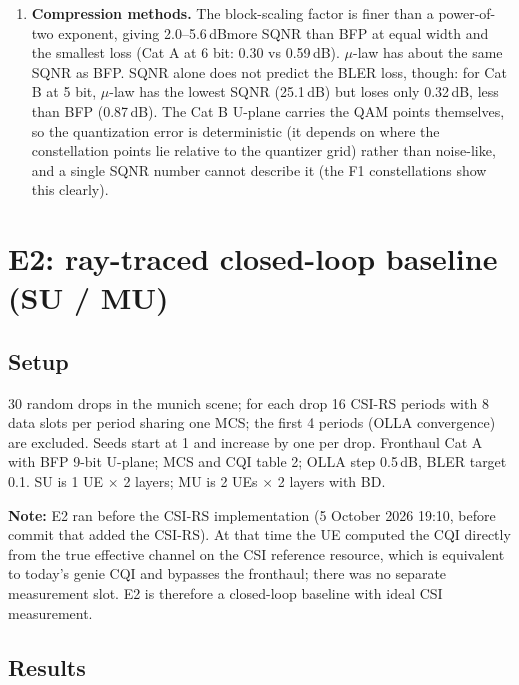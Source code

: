 \documentclass[11pt,a4paper]{article}
\DeclareRobustCommand{\code}[1]{\codeurl{#1}}  %
\newcommand{\dB}{\,dB}
\begin{document}
\begin{enumerate}
        co-scheduled UE by BD. At 5 bit and 30\dB, the RX EVM is therefore 10.9\% for Cat A and 8.0\% for Cat B. (With a single
        user the ranking reverses; see E3.)
  \item \textbf{Compression methods.} The block-scaling factor is finer than a power-of-two exponent, giving 2.0--5.6\dB more
        SQNR than BFP at equal width and the smallest loss (Cat A at 6 bit: 0.30 vs 0.59\dB). $\mu$-law has about the same SQNR as
        BFP. SQNR alone does not predict the BLER loss, though: for Cat B at 5 bit, $\mu$-law has the lowest SQNR (25.1\dB) but
        loses only 0.32\dB, less than BFP (0.87\dB). The Cat B U-plane carries the QAM points themselves, so the quantization
        error is deterministic (it depends on where the constellation points lie relative to the quantizer grid) rather than
        noise-like, and a single SQNR number cannot describe it (the F1 constellations show this clearly).
\end{enumerate}

\section{E2: ray-traced closed-loop baseline (SU / MU)}

\subsection{Setup}

30 random drops in the munich scene; for each drop 16 CSI-RS periods with 8 data slots per period sharing one MCS; the first
4 periods (OLLA convergence) are excluded. Seeds start at 1 and increase by one per drop. Fronthaul Cat A with BFP 9-bit
U-plane; MCS and CQI table 2; OLLA step 0.5\dB, BLER target 0.1. SU is 1 UE $\times$ 2 layers; MU is 2 UEs $\times$ 2 layers
with BD.

\textbf{Note:} E2 ran before the CSI-RS implementation (5 October 2026 19:10, before commit \code{e4fedff} that added the
CSI-RS). At that time the UE computed the CQI directly from the true effective channel on the CSI reference resource, which is
equivalent to today's genie CQI and bypasses the fronthaul; there was no separate measurement slot. E2 is therefore a closed-loop
baseline with ideal CSI measurement.

\subsection{Results}
\end{document}

